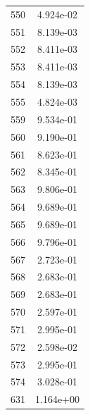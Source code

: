 \documentclass[12pt]{article}
\begin{document}
\begin{longtable}{@{}cc@{}}
550 & 4.924e-02 \\
551 & 8.139e-03 \\
552 & 8.411e-03 \\
553 & 8.411e-03 \\
554 & 8.139e-03 \\
555 & 4.824e-03 \\
559 & 9.534e-01 \\
560 & 9.190e-01 \\
561 & 8.623e-01 \\
562 & 8.345e-01 \\
563 & 9.806e-01 \\
564 & 9.689e-01 \\
565 & 9.689e-01 \\
566 & 9.796e-01 \\
567 & 2.723e-01 \\
568 & 2.683e-01 \\
569 & 2.683e-01 \\
570 & 2.597e-01 \\
571 & 2.995e-01 \\
572 & 2.598e-02 \\
573 & 2.995e-01 \\
574 & 3.028e-01 \\
631 & 1.164e+00 \\

\bottomrule
\end{longtable}
\end{document}
